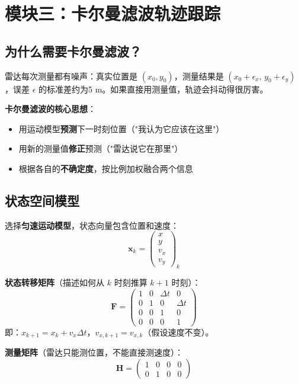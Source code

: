 \documentclass[12pt, a4paper]{article}
\newcommand{\mat}[1]{\boldsymbol{#1}}
\begin{document}
\section{模块三：卡尔曼滤波轨迹跟踪}

\subsection{为什么需要卡尔曼滤波？}

雷达每次测量都有噪声：真实位置是 $(x_0, y_0)$，测量结果是 $(x_0 + \epsilon_x,\, y_0 + \epsilon_y)$，误差 $\epsilon$ 的标准差约为5 m。如果直接用测量值，轨迹会抖动得很厉害。

\textbf{卡尔曼滤波的核心思想}：
\begin{itemize}
  \item 用运动模型\textbf{预测}下一时刻位置（"我认为它应该在这里"）
  \item 用新的测量值\textbf{修正}预测（"雷达说它在那里"）
  \item 根据各自的\textbf{不确定度}，按比例加权融合两个信息
\end{itemize}

\subsection{状态空间模型}

选择\textbf{匀速运动模型}，状态向量包含位置和速度：
\begin{equation}
\mat{x}_k = \begin{pmatrix} x \\ y \\ v_x \\ v_y \end{pmatrix}_k
\end{equation}

\textbf{状态转移矩阵}（描述如何从 $k$ 时刻推算 $k+1$ 时刻）：
\begin{equation}
\mat{F} = \begin{pmatrix} 1 & 0 & \Delta t & 0 \\ 0 & 1 & 0 & \Delta t \\ 0 & 0 & 1 & 0 \\ 0 & 0 & 0 & 1 \end{pmatrix}
\end{equation}
即：$x_{k+1} = x_k + v_x \Delta t$，$v_{x,k+1} = v_{x,k}$（假设速度不变）。

\textbf{测量矩阵}（雷达只能测位置，不能直接测速度）：
\begin{equation}
\mat{H} = \begin{pmatrix} 1 & 0 & 0 & 0 \\ 0 & 1 & 0 & 0 \end{pmatrix}
\end{equation}
\end{document}
